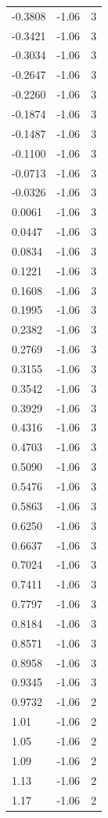 \begin{longtable}{lrr}
  -0.3808 & -1.06 & 3 \\
  -0.3421 & -1.06 & 3 \\
  -0.3034 & -1.06 & 3 \\
  -0.2647 & -1.06 & 3 \\
  -0.2260 & -1.06 & 3 \\
  -0.1874 & -1.06 & 3 \\
  -0.1487 & -1.06 & 3 \\
  -0.1100 & -1.06 & 3 \\
  -0.0713 & -1.06 & 3 \\
  -0.0326 & -1.06 & 3 \\
  0.0061 & -1.06 & 3 \\
  0.0447 & -1.06 & 3 \\
  0.0834 & -1.06 & 3 \\
  0.1221 & -1.06 & 3 \\
  0.1608 & -1.06 & 3 \\
  0.1995 & -1.06 & 3 \\
  0.2382 & -1.06 & 3 \\
  0.2769 & -1.06 & 3 \\
  0.3155 & -1.06 & 3 \\
  0.3542 & -1.06 & 3 \\
  0.3929 & -1.06 & 3 \\
  0.4316 & -1.06 & 3 \\
  0.4703 & -1.06 & 3 \\
  0.5090 & -1.06 & 3 \\
  0.5476 & -1.06 & 3 \\
  0.5863 & -1.06 & 3 \\
  0.6250 & -1.06 & 3 \\
  0.6637 & -1.06 & 3 \\
  0.7024 & -1.06 & 3 \\
  0.7411 & -1.06 & 3 \\
  0.7797 & -1.06 & 3 \\
  0.8184 & -1.06 & 3 \\
  0.8571 & -1.06 & 3 \\
  0.8958 & -1.06 & 3 \\
  0.9345 & -1.06 & 3 \\
  0.9732 & -1.06 & 2 \\
  1.01 & -1.06 & 2 \\
  1.05 & -1.06 & 2 \\
  1.09 & -1.06 & 2 \\
  1.13 & -1.06 & 2 \\
  1.17 & -1.06 & 2 \\

\end{longtable}
